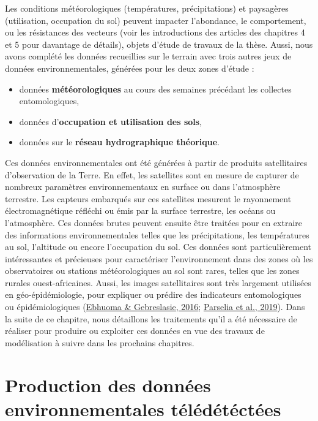 \documentclass[12pt,twoside]{reedthesis}
\providecommand{\tightlist}{%
  \setlength{\itemsep}{0pt}\setlength{\parskip}{0pt}}
\begin{document}
Les conditions météorologiques (températures, précipitations) et paysagères (utilisation, occupation du sol) peuvent impacter l'abondance, le comportement, ou les résistances des vecteurs (voir les introductions des articles des chapitres 4 et 5 pour davantage de détails), objets d'étude de travaux de la thèse. Aussi, nous avons complété les données recueillies sur le terrain avec trois autres jeux de données environnementales, générées pour les deux zones d'étude :
\begin{itemize}
\tightlist
\item
  données \textbf{météorologiques} au cours des semaines précédant les collectes entomologiques,
\item
  données d'\textbf{occupation et utilisation des sols},
\item
  données sur le \textbf{réseau hydrographique théorique}.
\end{itemize}
Ces données environnementales ont été générées à partir de produits satellitaires d'observation de la Terre. En effet, les satellites sont en mesure de capturer de nombreux paramètres environnementaux en surface ou dans l'atmosphère terrestre. Les capteurs embarqués sur ces satellites mesurent le rayonnement électromagnétique réfléchi ou émis par la surface terrestre, les océans ou l'atmosphère. Ces données brutes peuvent ensuite être traitées pour en extraire des informations environnementales telles que les précipitations, les températures au sol, l'altitude ou encore l'occupation du sol. Ces données sont particulièrement intéressantes et précieuses pour caractériser l'environnement dans des zones où les observatoires ou stations météorologiques au sol sont rares, telles que les zones rurales ouest-africaines. Aussi, les images satellitaires sont très largement utilisées en géo-épidémiologie, pour expliquer ou prédire des indicateurs entomologiques ou épidémiologiques (\protect\hyperlink{ref-ebhuoma_remote_2016}{Ebhuoma \& Gebreslasie, 2016}; \protect\hyperlink{ref-parselia_satellite_2019}{Parselia et al., 2019}). Dans la suite de ce chapitre, nous détaillons les traitements qu'il a été nécessaire de réaliser pour produire ou exploiter ces données en vue des travaux de modélisation à suivre dans les prochains chapitres.

\hypertarget{production-des-donnuxe9es-environnementales-tuxe9luxe9duxe9tuxe9ctuxe9es}{%
\section{Production des données environnementales télédétéctées}\label{production-des-donnuxe9es-environnementales-tuxe9luxe9duxe9tuxe9ctuxe9es}}
\end{document}
